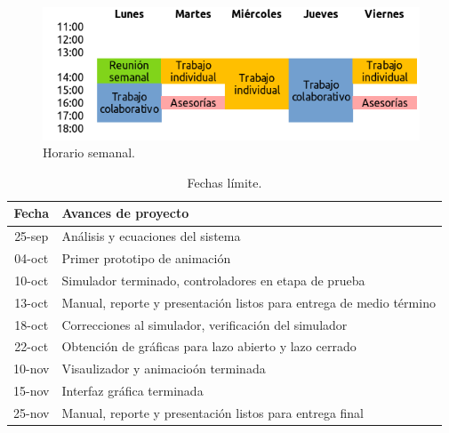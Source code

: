 \begin{figure}
 \centering
 \includegraphics[scale=0.6]{img/horario.png}
 \caption{Horario semanal.}
 \label{fig: horario}
\end{figure}

\begin{table}[h!]
\centering 
\begin{tabular}{c|l} 
\label{table: calendar} 
Fecha & Avances de proyecto\\ 
\hline 
25-sep & An\'alisis y ecuaciones del sistema\\
04-oct & Primer prototipo de animaci\'on\\
10-oct & Simulador terminado, controladores en etapa de 
prueba\\
13-oct & Manual, reporte y presentaci\'on listos para 
entrega de medio t\'ermino\\
18-oct & Correcciones al simulador, verificaci\'on del 
simulador\\
22-oct & Obtenci\'on de gr\'aficas para lazo abierto y 
lazo cerrado\\
10-nov & Visaulizador y animacio\'on terminada\\
15-nov & Interfaz gr\'afica terminada\\
25-nov & Manual, reporte y presentaci\'on listos para 
entrega final\\

\hline 
\end{tabular} 
\caption{Fechas l\'imite.} 
\end{table}
